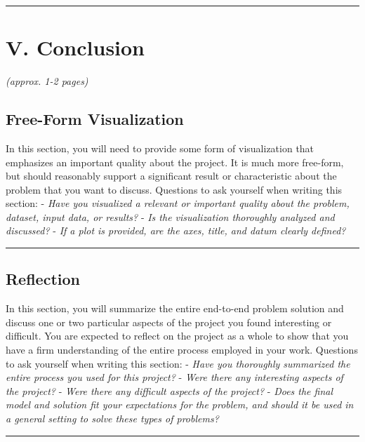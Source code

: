 \documentclass[12pt]{article}
\begin{document}
\begin{center}\rule{0.5\linewidth}{\linethickness}\end{center}

\section{V. Conclusion}\label{v.-conclusion}

\emph{(approx. 1-2 pages)}

\subsection{Free-Form Visualization}\label{free-form-visualization}

In this section, you will need to provide some form of visualization
that emphasizes an important quality about the project. It is much more
free-form, but should reasonably support a significant result or
characteristic about the problem that you want to discuss. Questions to
ask yourself when writing this section: - \emph{Have you visualized a
relevant or important quality about the problem, dataset, input data, or
results?} - \emph{Is the visualization thoroughly analyzed and
discussed?} - \emph{If a plot is provided, are the axes, title, and
datum clearly defined?}

\begin{center}\rule{0.5\linewidth}{\linethickness}\end{center}

\subsection{Reflection}\label{reflection}

In this section, you will summarize the entire end-to-end problem
solution and discuss one or two particular aspects of the project you
found interesting or difficult. You are expected to reflect on the
project as a whole to show that you have a firm understanding of the
entire process employed in your work. Questions to ask yourself when
writing this section: - \emph{Have you thoroughly summarized the entire
process you used for this project?} - \emph{Were there any interesting
aspects of the project?} - \emph{Were there any difficult aspects of the
project?} - \emph{Does the final model and solution fit your
expectations for the problem, and should it be used in a general setting
to solve these types of problems?}

\begin{center}\rule{0.5\linewidth}{\linethickness}\end{center}
\end{document}

